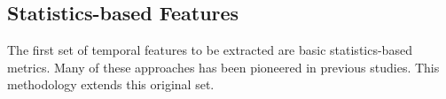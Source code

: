 \subsection{Statistics-based Features}
\label{sec:statisticsfeatures}

The first set of temporal features to be extracted are basic statistics-based metrics. Many of these approaches has been pioneered in previous studies. This methodology extends this original set.
